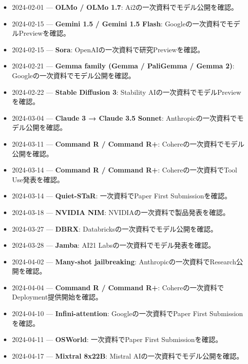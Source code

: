 \begin{itemize}[leftmargin=1.5em,itemsep=0.45em]
\item 2024-02-01 — \textbf{OLMo / OLMo 1.7}: Ai2の一次資料でモデル公開を確認。 \autocite{src-3d2fa83e273d}
\item 2024-02-15 — \textbf{Gemini 1.5 / Gemini 1.5 Flash}: Googleの一次資料でモデルPreviewを確認。 \autocite{src-28ee6f0f00f4}
\item 2024-02-15 — \textbf{Sora}: OpenAIの一次資料で研究Previewを確認。 \autocite{src-0fe343211040}
\item 2024-02-21 — \textbf{Gemma family (Gemma / PaliGemma / Gemma 2)}: Googleの一次資料でモデル公開を確認。 \autocite{src-0395647db4a8}
\item 2024-02-22 — \textbf{Stable Diffusion 3}: Stability AIの一次資料でモデルPreviewを確認。 \autocite{src-7b3484ead314}
\item 2024-03-04 — \textbf{Claude 3 → Claude 3.5 Sonnet}: Anthropicの一次資料でモデル公開を確認。 \autocite{src-e91e6f80eaac}
\item 2024-03-11 — \textbf{Command R / Command R+}: Cohereの一次資料でモデル公開を確認。 \autocite{src-77e35e5f22be}
\item 2024-03-14 — \textbf{Command R / Command R+}: Cohereの一次資料でTool Use発表を確認。 \autocite{src-77e35e5f22be}
\item 2024-03-14 — \textbf{Quiet-STaR}: 一次資料でPaper First Submissionを確認。 \autocite{src-12fa04e64d24}
\item 2024-03-18 — \textbf{NVIDIA NIM}: NVIDIAの一次資料で製品発表を確認。 \autocite{src-054d1f81750b}
\item 2024-03-27 — \textbf{DBRX}: Databricksの一次資料でモデル公開を確認。 \autocite{src-ff36b1c2ef30}
\item 2024-03-28 — \textbf{Jamba}: AI21 Labsの一次資料でモデル発表を確認。 \autocite{src-b5fbfc0d43e4}
\item 2024-04-02 — \textbf{Many-shot jailbreaking}: Anthropicの一次資料でResearch公開を確認。 \autocite{src-018fb3abd44d}
\item 2024-04-04 — \textbf{Command R / Command R+}: Cohereの一次資料でDeployment提供開始を確認。 \autocite{src-77e35e5f22be}
\item 2024-04-10 — \textbf{Infini-attention}: Googleの一次資料でPaper First Submissionを確認。 \autocite{src-2eb2353f0533}
\item 2024-04-11 — \textbf{OSWorld}: 一次資料でPaper First Submissionを確認。 \autocite{src-70b5d4b3bedd}
\item 2024-04-17 — \textbf{Mixtral 8x22B}: Mistral AIの一次資料でモデル公開を確認。 \autocite{src-05f98c47f3e8}

\end{itemize}
